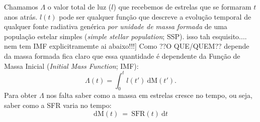Chamamos $\Lambda$ o valor total de luz ($l$) que recebemos de estrelas que se formaram $t$ anos atrás. $l(t)$ pode ser qualquer função que descreve a evolução temporal de qualquer fonte radiativa genérica \emph{por unidade de massa formada} de uma população estelar simples ({\em simple stellar population}; SSP). {\ATR \ojo isso tah esquisito.... nem tem IMF explicitramemte ai abaixo!!!] Como ??O QUE/QUEM?? depende da massa formada fica claro que essa quantidade é dependente da Função de Massa Inicial ({\em Initial Mass Function}; IMF):
\begin{equation}
	\Lambda(t) = \int_0^t l(t')\ \textrm{d}\textrm{M}(t').
	\label{eq:dLambda}
\end{equation}
}
\noindent Para obter $\Lambda$ nos falta saber como a massa em estrelas cresce no tempo, ou seja, saber como a SFR varia no tempo:
\begin{equation}
	\mathrm{d}\mathrm{M}(t)\ =\ \mathrm{SFR}(t)\ \mathrm{d}t
	\label{eq:dM_t}
\end{equation}

